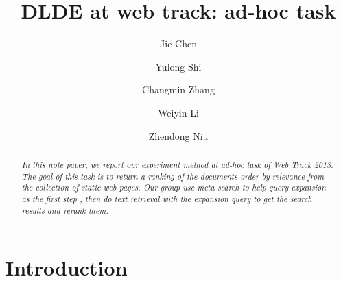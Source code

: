 \documentclass[runningheads,a4paper]{llncs}
\begin{document}
\mainmatter  %

\title{DLDE at web track: ad-hoc task}


%
%
\author{Jie Chen \and Yulong Shi \and Changmin Zhang \and Weiyin Li \and Zhendong Niu}

%


%
%

\maketitle

\begin{abstract}
\emph{In this note paper, we report our experiment method at ad-hoc task of Web Track 2013. The goal of this task is to return a ranking of the documents order by relevance from the collection of static web pages. Our group use meta search to help query expansion as the first step , then do text retrieval with the expansion query to get the search results and rerank them. }
\end{abstract}

\section{Introduction}
\end{document}
